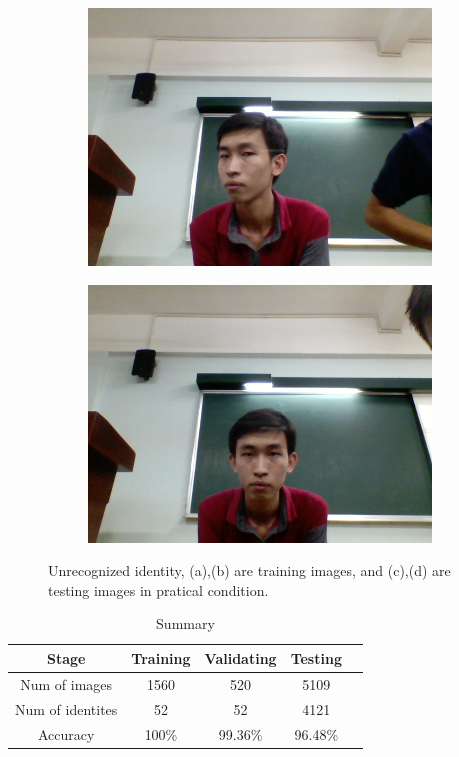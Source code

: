 \documentclass[journal, twocolumn]{IEEEtran}
\begin{document}
\begin{figure}[h!]
\begin{subfigure}[b]{0.35\linewidth}
    \includegraphics[width=\linewidth]{img/3.png}
    \caption{}
  \end{subfigure}
    \begin{subfigure}[b]{0.35\linewidth}
    \includegraphics[width=\linewidth]{img/4.png}
    \caption{}
  \end{subfigure}
  \caption{Unrecognized identity, (a),(b) are training images, and (c),(d) are testing images in pratical condition.} 
  \label{fig:compare}
\end{figure}


\begin{table}[!h]
\centering
\caption{Summary}\label{tab:summary} 
\begin{tabular}{|c|c|c|c|c|} 
\hline
Stage & Training & Validating & Testing \\
\hline
Num of images & 1560 & 520 & 5109 \\ 
\hline
Num of identites & 52 & 52 & 4121 \\ 
\hline
Accuracy & 100\% & 99.36\% & 96.48\% \\
\hline
\end{tabular}
\end{table}
\end{document}
